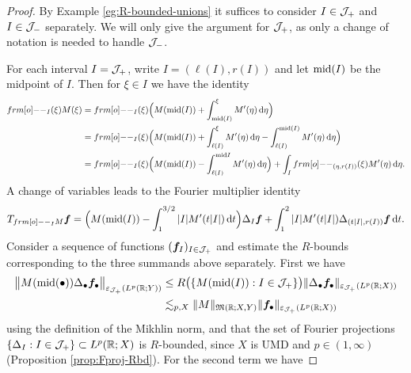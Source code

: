 \begin{proof}
  By Example \ref{eg:R-bounded-unions} it suffices to consider $I \in \mathcal{J}_{+}$ and $I \in \mathcal{J}_{-}$ separately.
  We will only give the argument for $\mathcal{J}_{+}$, as only a change of notation is needed to handle $\mathcal{J}_{-}$.

  For each interval $I = \mathcal{J}_{+}$, write $I = (\ell(I), r(I))$ and let $\mathrm{mid}(I)$ be the midpoint of $I$.
  Then for $\xi \in I$ we have the identity
  \begin{equation*}
    \begin{aligned}
      \1_{I}(\xi)M(\xi)
      &= \1_{I}(\xi) \Big( M(\midp(I)) + \int_{\midp(I)}^{\xi} M'(\eta) \, \dd\eta \Big) \\
      &= \1_{I}(\xi) \Big( M(\midp(I)) + \int_{\ell(I)}^{\xi} M'(\eta) \, \dd\eta - \int_{\ell(I)}^{\midp(I)} M'(\eta) \, \dd\eta \Big) \\
      &= \1_{I}(\xi) \Big( M(\midp(I)) - \int_{\ell(I)}^{\midp{I}} M'(\eta) \, \dd\eta \Big) + \int_{I} \1_{(\eta,r(I))}(\xi) M'(\eta) \, \dd\eta.
    \end{aligned}
  \end{equation*}
  A change of variables leads to the Fourier multiplier identity
  \begin{equation*}
    T_{\1_I M} \mb{f}
    = \Big( M(\midp(I)) - \int_{1}^{3/2} |I| M'(t|I|) \, \dd t \Big)\Delta_{I} \mb{f} + \int_{1}^{2} |I| M'(t|I|) \Delta_{(t|I|,r(I))} \mb{f} \, \dd t.
  \end{equation*}
  Consider a sequence of functions $(\bm{f}_{I})_{I \in \mathcal{J}_{+}}$ and estimate the $R$-bounds corresponding to the three summands above separately.
  First we have
  \begin{equation*}
    \begin{aligned}
      \big\|M(\mathrm{mid}(\bullet)) \Delta_{\bullet} \bm{f}_{\bullet} \big\|_{\varepsilon_{\mathcal{J}_{+}}(L^p(\mathbb{R};Y))}
      &\leq R\big( \{M(\mathrm{mid}(I)) : I \in \mathcal{J}_{+} \} \big) \|\Delta_{\bullet} \bm{f}_{\bullet} \|_{\varepsilon_{\mathcal{J}_{+}}(L^p(\mathbb{R};X))} \\
      &\lesssim_{p,X} \|M\|_{\mathfrak{M}(\mathbb{R};X,Y)} \| \bm{f}_{\bullet} \|_{\varepsilon_{\mathcal{J}_{+}}(L^p(\mathbb{R};X))} 
  \end{aligned}
\end{equation*}
using the definition of the Mikhlin norm, and that the set of Fourier projections $\{\Delta_{I} : I \in \mathcal{J}_{+}\} \subset L^p(\mathbb{R};X)$ is $R$-bounded, since $X$ is UMD and $p \in (1,\infty)$ (Proposition \ref{prop:Fproj-Rbd}).
For the second term we have

\end{proof}
